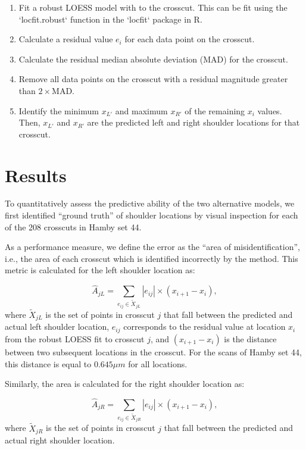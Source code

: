 \documentclass[12pt]{article}
\begin{document}
\begin{enumerate}
\item Fit a robust LOESS model with  to the crosscut. This can be fit using the `locfit.robust` function in the `locfit` package in R. 
\item Calculate a residual value $e_i$ for each data point on the crosscut.  
\item Calculate the residual median absolute deviation (MAD) for the crosscut.  
\item Remove all data points on the crosscut with a residual magnitude greater than $2 \times$MAD.  
\item Identify the minimum $x_{L'}$ and maximum $x_{R'}$ of the remaining $x_i$ values. Then, $x_{L'}$ and $x_{R'}$ are the predicted left and right shoulder locations for that crosscut.   
\end{enumerate}

\section{Results}

To quantitatively assess the predictive ability of the two alternative
models, we first identified ``ground truth'' of shoulder locations by
visual inspection for each of the 208 crosscuts in Hamby set 44.

As a performance measure, we define the error as the ``area of
misidentification'', i.e., the area of each crosscut which is identified
incorrectly by the method. This metric is calculated for the left
shoulder location as:

\[ \widehat{A}_{jL} = \sum_{e_{ij} \in \widetilde{X}_{jL}} \left|e_{ij} \right| \times \left(x_{i+1} - x_i \right),\]
where \(\widetilde{X}_{jL}\) is the set of points in crosscut \(j\) that
fall between the predicted and actual left shoulder location, \(e_{ij}\)
corresponds to the residual value at location \(x_i\) from the robust
LOESS fit to crosscut \(j\), and \((x_{i+1} - x_i)\) is the distance
between two subsequent locations in the crosscut. For the scans of Hamby
set 44, this distance is equal to \(0.645 \mu m\) for all locations.

Similarly, the area is calculated for the right shoulder location as:

\[ \widehat{A}_{jR} = \sum_{e_{ij} \in \widetilde{X}_{jR}} \left|e_{ij} \right| \times \left(x_{i+1} - x_i \right),\]
where \(\widetilde{X}_{jR}\) is the set of points in crosscut \(j\) that
fall between the predicted and actual right shoulder location.
\end{document}
